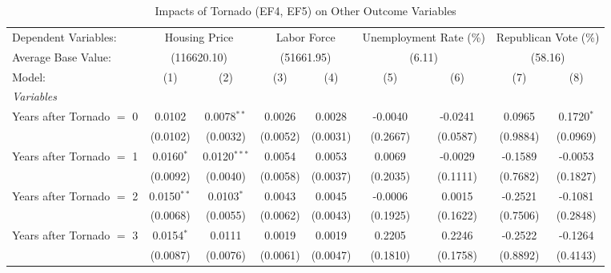 \documentclass[letterpaper]{article}
\begin{document}
\begin{table}[H]
    \centering
    \caption{Impacts of Tornado (EF4, EF5) on Other Outcome Variables}
    \label{t5}
    \small
\begin{tabular}{lcccccccc}
   \midrule \midrule
   Dependent Variables: & \multicolumn{2}{c}{Housing Price} & \multicolumn{2}{c}{Labor Force} & \multicolumn{2}{c}{Unemployment Rate (\%)} & \multicolumn{2}{c}{Republican Vote (\%)}\\
   Average Base Value: & \multicolumn{2}{c}{(116620.10)} & \multicolumn{2}{c}{(51661.95)} & \multicolumn{2}{c}{(6.11)} & \multicolumn{2}{c}{(58.16)}\\ 
   Model:                                    & (1)             & (2)             & (3)             & (4)             & (5)             & (6)             & (7)            & (8)\\  
   \midrule
   \emph{Variables}\\
   Years after Tornado $=$ 0  & 0.0102          & 0.0078$^{**}$   & 0.0026          & 0.0028          & -0.0040         & -0.0241         & 0.0965         & 0.1720$^{*}$\\   
                                             & (0.0102)        & (0.0032)        & (0.0052)        & (0.0031)        & (0.2667)        & (0.0587)        & (0.9884)       & (0.0969)\\   
   Years after Tornado $=$ 1  & 0.0160$^{*}$    & 0.0120$^{***}$  & 0.0054          & 0.0053          & 0.0069          & -0.0029         & -0.1589        & -0.0053\\   
                                             & (0.0092)        & (0.0040)        & (0.0058)        & (0.0037)        & (0.2035)        & (0.1111)        & (0.7682)       & (0.1827)\\   
   Years after Tornado $=$ 2  & 0.0150$^{**}$   & 0.0103$^{*}$    & 0.0043          & 0.0045          & -0.0006         & 0.0015          & -0.2521        & -0.1081\\   
                                             & (0.0068)        & (0.0055)        & (0.0062)        & (0.0043)        & (0.1925)        & (0.1622)        & (0.7506)       & (0.2848)\\   
   Years after Tornado $=$ 3  & 0.0154$^{*}$    & 0.0111          & 0.0019          & 0.0019          & 0.2205          & 0.2246          & -0.2522        & -0.1264\\   
                                             & (0.0087)        & (0.0076)        & (0.0061)        & (0.0047)        & (0.1810)        & (0.1758)        & (0.8892)       & (0.4143)\\   

\end{tabular}
\end{table}
\end{document}
